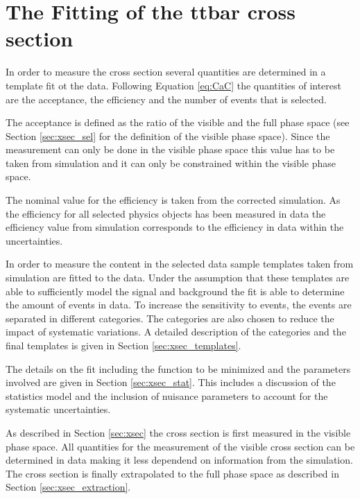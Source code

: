 \chapter{The Fitting of the ttbar cross section}

\label{sec:xsec_fit}

In order to measure the cross section several quantities are determined in a template fit ot the data. Following Equation \ref{eq:CaC} the quantities of interest are the 
acceptance, the efficiency and the number of \ttbar events that is selected. 

The acceptance is defined as the ratio of the visible and the full phase space (see Section \ref{sec:xsec_sel} for the definition of the visible phase space).
Since the measurement can only be done in the visible phase space this value has to be taken from simulation and it can only be constrained within the visible phase space.

The nominal value for the efficiency is taken from the corrected simulation. 
As the efficiency for all selected physics objects has been measured in data the efficiency value from simulation corresponds to the efficiency in data within the uncertainties.

In order to measure the \ttbar content in the selected data sample templates taken from simulation are fitted to the data. Under the assumption that these templates are able to sufficiently 
model the signal and background the fit is able to determine the amount of \ttbar events in data.
To increase the sensitivity to \ttbar events, the events are separated in different categories.
The categories are also chosen to reduce the impact of systematic variations.
A detailed description of the categories and the final templates is given in Section \ref{sec:xsec_templates}.

The details on the fit including the function to be minimized and the parameters involved are given in Section \ref{sec:xsec_stat}.
This includes a discussion of the statistics model and the inclusion of nuisance parameters to account for the systematic uncertainties.

As described in Section \ref{sec:xsec} the cross section is first measured in the visible phase space. 
All quantities for the measurement of the visible cross section can be determined in data making it less dependend on information from the simulation.
The cross section is finally extrapolated to the full phase space as described in Section \ref{sec:xsec_extraction}.


